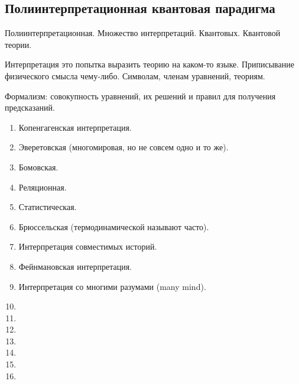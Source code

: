 \documentclass[a4paper, 12pt]{article}
\begin{document}

\subsection{Полиинтерпретационная квантовая парадигма}

Полиинтерпретационная. Множество интерпретаций. Квантовых. Квантовой 
теории.

Интерпретация это попытка выразить теорию на каком-то языке. 
Приписывание физического смысла чему-либо. Символам, членам уравнений, 
теориям.

Формализм: совокупность уравнений, их решений и правил для получения 
предсказаний.


\begin{enumerate}
  \item Копенгагенская интерпретация.
  \item Эверетовская (многомировая, но не совсем одно и то же).
  \item Бомовская.
  \item Реляционная.
  \item Статистическая.
  \item Брюссельская (термодинамической называют часто).
  \item Интерпретация совместимых историй.
  \item Фейнмановская интерпретация.
  \item Интерпретация со многими разумами (many mind).
  \item
  \item
  \item
  \item
  \item
  \item
  \item
\end{enumerate}


\end{document}
